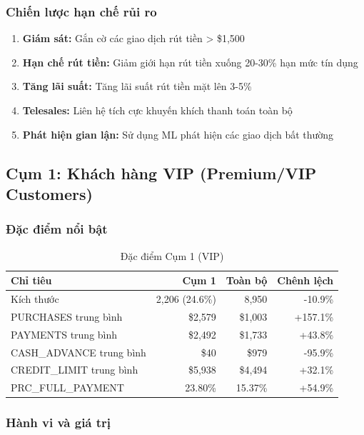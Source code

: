 \subsubsection{Chiến lược hạn chế rủi ro}

\begin{enumerate}
    \item \textbf{Giám sát:} Gắn cờ các giao dịch rút tiền > \$1,500
    \item \textbf{Hạn chế rút tiền:} Giảm giới hạn rút tiền xuống 20-30\% hạn mức tín dụng
    \item \textbf{Tăng lãi suất:} Tăng lãi suất rút tiền mặt lên 3-5\%
    \item \textbf{Telesales:} Liên hệ tích cực khuyến khích thanh toán toàn bộ
    \item \textbf{Phát hiện gian lận:} Sử dụng ML phát hiện các giao dịch bất thường
\end{enumerate}

\subsection{Cụm 1: Khách hàng VIP (Premium/VIP Customers)}

\subsubsection{Đặc điểm nổi bật}

\begin{table}[H]
\centering
\caption{Đặc điểm Cụm 1 (VIP)}
\begin{tabular}{|l|r|r|r|}
\hline
\textbf{Chỉ tiêu} & \textbf{Cụm 1} & \textbf{Toàn bộ} & \textbf{Chênh lệch} \\
\hline
Kích thước & 2,206 (24.6\%) & 8,950 & -10.9\% \\
\hline
PURCHASES trung bình & \$2,579 & \$1,003 & +157.1\% \\
\hline
PAYMENTS trung bình & \$2,492 & \$1,733 & +43.8\% \\
\hline
CASH\_ADVANCE trung bình & \$40 & \$979 & -95.9\% \\
\hline
CREDIT\_LIMIT trung bình & \$5,938 & \$4,494 & +32.1\% \\
\hline
PRC\_FULL\_PAYMENT & 23.80\% & 15.37\% & +54.9\% \\
\hline
\end{tabular}
\end{table}

\subsubsection{Hành vi và giá trị}

